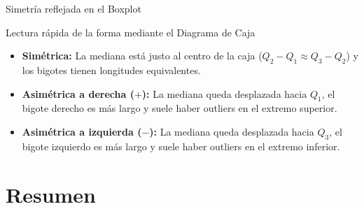 \documentclass[aspectratio=169,11pt]{beamer}
\begin{document}
\begin{frame}{Simetría reflejada en el Boxplot}
\begin{block}{Lectura rápida de la forma mediante el Diagrama de Caja}
\begin{itemize}
    \item \textbf{Simétrica:} La mediana está justo al centro de la caja ($Q_2 - Q_1 \approx Q_3 - Q_2$) y los bigotes tienen longitudes equivalentes.
    \item \textbf{Asimétrica a derecha ($+$):} La mediana queda desplazada hacia $Q_1$, el bigote derecho es más largo y suele haber outliers en el extremo superior.
    \item \textbf{Asimétrica a izquierda ($-$):} La mediana queda desplazada hacia $Q_3$, el bigote izquierdo es más largo y suele haber outliers en el extremo inferior.
\end{itemize}
\end{block}

\vspace{0.3cm}
\centering
{}
\end{frame}

\section{Resumen}
\end{document}
